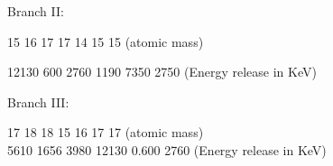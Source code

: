  \vspace{1cm}
 
 
 \hspace{3 cm} Branch II: \\	
 \begin{center}
 \end{center}
 \vspace{-2mm}
 \hspace{4.5cm} {\scriptsize 15 \hspace{0.7cm} 16 \hspace{0.7cm} 17 \hspace{0.9cm} 17 \hspace{0.7cm} 14 \hspace{0.8cm} 15 \hspace{0.9cm} 15 \hfill (atomic mass) \\
 	\vspace{-2mm}
 	
 	\hspace{4.4cm} 12130 \hspace{0.4cm}  600 \hspace{0.5cm}  2760 \hspace{0.6cm}  1190 \hspace{0.5cm}  7350 \hspace{0.5cm} 2750 \hfill (Energy release in KeV)}
 
 \vspace{1cm}
 
 
 \hspace{3 cm} Branch III: \\	
 \begin{center}
 \end{center}
 \vspace{-2mm}
 \hspace{4.7cm} {\scriptsize 17 \hspace{0.6cm} 18 \hspace{0.7cm} 18 \hspace{0.5cm} 15 \hspace{0.6cm} 16 \hspace{0.8cm} 17 \hspace{0.5cm} 17 \hfill (atomic mass) \\
 	
 	\vspace{-2mm}
 	\hspace{4.6cm} 5610 \hspace{0.4cm}  1656 \hspace{0.3cm}  3980 \hspace{0.2cm}  12130 \hspace{0.3cm}  0.600 \hspace{0.3cm} 2760 \hfill (Energy release in KeV)}
 
